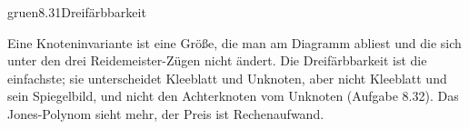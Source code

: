 \begin{loesungkarte}{gruen}{8.31}{Dreifärbbarkeit}
\begin{mitnehmen}\kastentext
Eine Knoteninvariante ist eine Größe, die man am Diagramm abliest und die sich unter den drei Reidemeister-Zügen nicht ändert. Die Dreifärbbarkeit ist die einfachste; sie unterscheidet Kleeblatt und Unknoten, aber nicht Kleeblatt und sein Spiegelbild, und nicht den Achterknoten vom Unknoten (Aufgabe 8.32). Das Jones-Polynom sieht mehr, der Preis ist Rechenaufwand.
\end{mitnehmen}
\end{loesungkarte}

